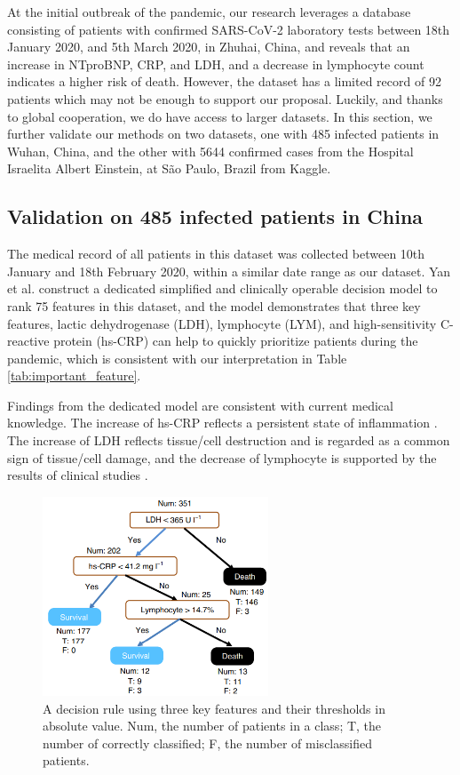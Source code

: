 At the initial outbreak of the pandemic, our research leverages a database consisting of patients with confirmed SARS-CoV-2 laboratory tests between 18th January 2020, and 5th March 2020, in Zhuhai, China, and reveals that an increase in NTproBNP, CRP, and LDH, and a decrease in lymphocyte count indicates a higher risk of death. However, the dataset has a limited record of 92 patients which may not be enough to support our proposal. Luckily, and thanks to global cooperation, we do have access to larger datasets. In this section, we further validate our methods on two datasets, one with 485 infected patients in Wuhan, China\citep{Yan2020}, and the other with 5644 confirmed cases from the Hospital Israelita Albert Einstein, at São Paulo, Brazil from Kaggle.

\subsection{Validation on 485 infected patients in China}

The medical record of all patients in this dataset was collected between 10th January and 18th February 2020, within a similar date range as our dataset. Yan et al. construct a dedicated simplified and clinically operable decision model to rank 75 features in this dataset, and the model demonstrates that three key features, lactic dehydrogenase (LDH), lymphocyte (LYM), and high-sensitivity C-reactive protein (hs-CRP) can help to quickly prioritize patients during the pandemic, which is consistent with our interpretation in Table \ref{tab:important_feature}.

Findings from the dedicated model are consistent with current medical knowledge. The increase of hs-CRP reflects a persistent state of inflammation \citep{pmid19411291}. The increase of LDH reflects tissue/cell destruction and is regarded as a common sign of tissue/cell damage, and the decrease of lymphocyte is supported by the results of clinical studies \citep{chen2020epidemiological}.

\begin{figure}[H]
\centering
\includegraphics[width=0.6\textwidth]{figures/chapter_interp/nature_dt.png}
\caption{A decision rule using three key features and their thresholds in
absolute value. Num, the number of patients in a class; T, the number of
correctly classified; F, the number of misclassified patients. \citep{Yan2020}}
\end{figure}

